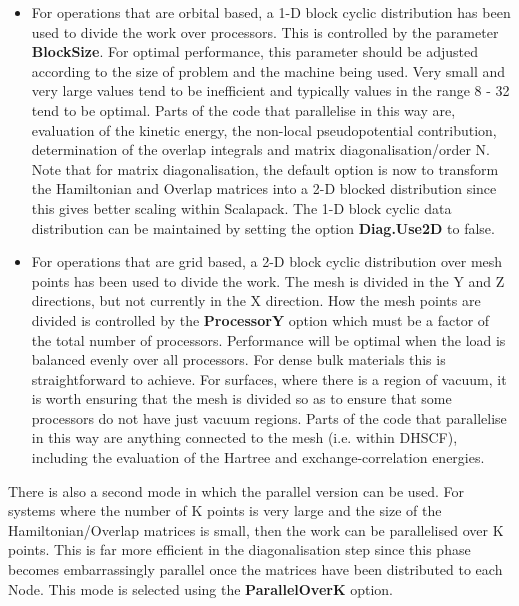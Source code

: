 \documentclass[11pt]{article}
\begin{document}
\begin{itemize}
\item
For operations that are orbital based, a 1-D block cyclic distribution
has been used to divide the work over processors. This is controlled
by the parameter {\bf BlockSize}.
For optimal performance, this parameter
should be adjusted according to the size of problem and the machine
being used. Very small and very large values tend to be inefficient
and typically values in the range 8 - 32 tend to be optimal. Parts of
the code that parallelise in this way are, evaluation of the kinetic
energy, the non-local pseudopotential contribution, determination of
the overlap integrals and matrix diagonalisation/order N. Note that
for matrix diagonalisation, the default option is now to transform the
Hamiltonian and Overlap matrices into a 2-D blocked distribution since
this gives better scaling within Scalapack. The 1-D block cyclic
data distribution can be maintained by setting the option {\bf Diag.Use2D}
to false.

\item
For operations that are grid based, a 2-D block cyclic distribution
over mesh points has been used to divide the work. The mesh is divided
in the Y and Z directions, but not currently in the X direction. How
the mesh points are divided is controlled by the {\bf ProcessorY}
option which must be a factor of the total number of processors.
Performance will be optimal when the load is balanced evenly
over all processors. For dense bulk materials this is straightforward
to achieve. For surfaces, where there is a region of vacuum, it is
worth ensuring that the mesh is divided so as to ensure that some
processors do not have just vacuum regions. Parts of the code that
parallelise in this way are anything connected to the mesh (i.e. within
DHSCF), including the evaluation of the Hartree and exchange-correlation
energies.
\end{itemize}

There is also a second mode in which the parallel version can be used. For
systems where the number of K points is very large and the size of the
Hamiltonian/Overlap matrices is small, then the work can be parallelised
over K points. This is far more efficient in the diagonalisation step
since this phase becomes embarrassingly parallel once the matrices have
been distributed to each Node. This mode is selected using the
{\bf ParallelOverK} 
option.
\end{document}
